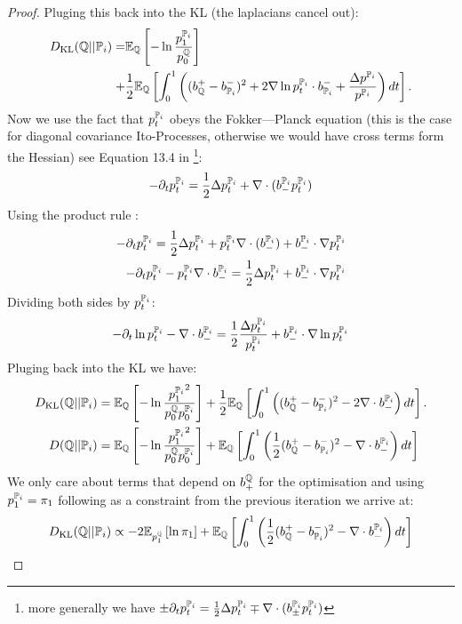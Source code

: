 \documentclass[a4paper,12pt,twoside,openright]{report}
\theoremstyle{definition}
\begin{document}
\begin{proof}
Pluging this back into the KL (the laplacians cancel out):
\begin{align*}
\KL(\Q||{\P_{i}}) = &\E_\Q\left[-\log \frac{ p^{\P_{i}}_1}{ p^\Q_0}\right] \\+ &\frac{1}{2}\E_{\Q}\left[\int_0^1 \left(( b_\Q^{+} - b_{\P_{i}}^{-})^2 + 2\nabla\log p_t^{\P_{i}} \cdot b_{\P_{i}}^{-}+ \frac{\Delta  p^{\P_{i}}}{ p^{\P_{i}}}\right)dt\right].
\end{align*}
Now we use the fact that $ p_t^{\P_{i}}$ obeys the Fokker—Planck equation (this is the case for diagonal covariance Ito-Processes, otherwise we would have cross terms form the Hessian) see Equation 13.4 in \cite{nelson1967dynamical}\footnote{more generally we have $\pm\partial_t p_t^{\P_{i}} = \frac{1}{2}\Delta p_t^{\P_{i}}\mp\nabla\cdot(b_\pm^{\P_{i}} p_t^{\P_{i}})$}: 
\begin{align*}
-\partial_t p_t^{\P_{i}} = \frac{1}{2}\Delta p_t^{\P_{i}}+\nabla\cdot(b_{-}^{\P_{i}} p_t^{\P_{i}})
\end{align*}
Using the product rule : 
\begin{align*}
-\partial_t p_t^{\P_{i}} = \frac{1}{2}\Delta p_t^{\P_{i}}+  p_t^{\P_{i}} \nabla\cdot(b_{-}^{\P_{i}}) + b_{-}^{\P_{i}} \cdot \nabla p_t^{\P_{i}} \\
-\partial_t p_t^{\P_{i}} -  p_t^{\P_{i}} \nabla\cdot b_{-}^{\P_{i}}  = \frac{1}{2}\Delta p_t^{\P_{i}}+ b_{-}^{\P_{i}} \cdot\nabla  p_t^{\P_{i}}
\end{align*}
Dividing both sides by $ p_t^{\P_{i}}$:
\begin{align*}
-\partial_t \log  p_t^{\P_{i}} - \nabla\cdot b_{-}^{\P_{i}}  = \frac{1}{2}\frac{\Delta  p_t^{\P_{i}}}{ p_t^{\P_{i}}}+  b_{-}^{\P_{i}} \cdot \nabla \log  p_t^{\P_{i}}
\end{align*}
Pluging back into the KL we have:
\begin{align*}
\KL(\Q||{\P_{i}}) &= \E_\Q\left[-\log \frac{{ p^{\P_{i}}_1}^2}{ p^\Q_0  p_0^{{\P_{i}}}}\right] + \frac{1}{2}\E_{\Q}\left[\int_0^1 \left(( b_\Q^{+} - b_{\P_{i}}^{-})^2 - 2\nabla\cdot b_{-}^{\P_{i}} \right)dt\right]. \\
D(\Q||{\P_{i}}) &= \E_\Q\left[-\log \frac{{ p^{\P_{i}}_1}^2}{ p^\Q_0   p_0^{{\P_{i}}}}\right] + \E_{\Q}\left[\int_0^1 \left(\frac{1}{2}( b_\Q^{+} - b_{\P_{i}}^{-})^2 - \nabla\cdot b_{-}^{\P_{i}} \right)dt\right]
\end{align*}
We only care about terms that depend on $b_{+}^\Q$ for the optimisation and using $p^{\P_{i}}_1=\pi_1$ following as a constraint from the previous iteration we arrive at:
\begin{align}
\KL(\Q||{\P_{i}}) \propto -2\E_{ p^\Q_1}\left[\log {{ \pi_1 }} \right] + \E_{\Q}\left[\int_0^1 \left(\frac{1}{2}( b_\Q^{+} - b_{\P_{i}}^{-})^2 - \nabla\cdot b_{-}^{\P_{i}} \right)dt\right]
\end{align}
\end{proof}
\end{document}
